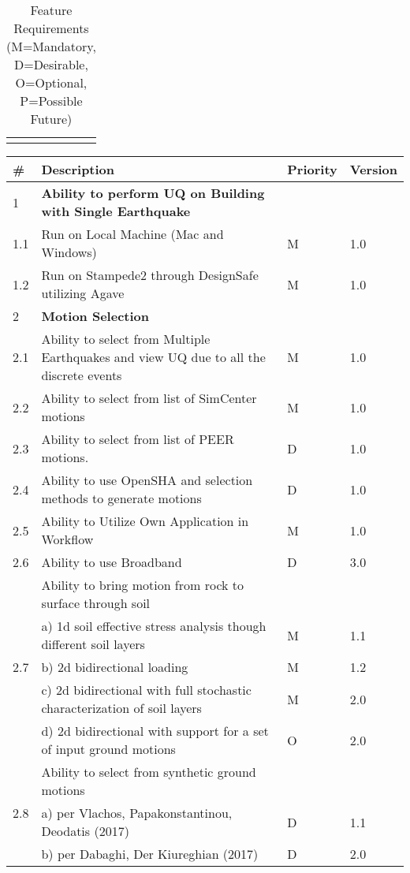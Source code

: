 {\begin{longtable}{| p{} | p{} | p{} | p{} |}
	\bottomrule 
\caption{Feature Requirements (M=Mandatory, D=Desirable, O=Optional, P=Possible Future)}             
  \label{tab:featureRequirements}                 
\end{longtable}
}{

\iffalse
\begin{longtable}{| p{} | p{} | p{} | p{} |}
    \toprule
      \# & Description & Priority & Version \\ \hline
      1 & \textbf{Ability to perform UQ on Building with Single Earthquake} &  &  \\ 
	1.1 & Run on Local Machine (Mac and Windows) & M & 1.0 \\ \hline
	1.2 & Run on Stampede2 through DesignSafe utilizing Agave & M & 1.0 \\ \hline
	2 & \textbf{Motion Selection} &  &  \\ \hline
	2.1 & Ability to select from Multiple Earthquakes and view UQ due to all the discrete events & M & 1.0  \\ \hline
	2.2 & Ability to select from list of SimCenter motions & M & 1.0 \\ \hline
	2.3 & Ability to select from list of PEER motions. & D & 1.0 \\ \hline
	2.4 & Ability to use OpenSHA and selection methods to generate motions & D & 1.0 \\ \hline
	2.5 & Ability to Utilize Own Application in Workflow & M & 1.0 \\ \hline
	2.6 & Ability to use Broadband & D & 3.0 \\ \hline
	\multirow{5}{*}{2.7} 
	& Ability to bring motion from rock to surface through soil &  &  \\ 
	 & a)     1d soil effective stress analysis though different soil layers & M & 1.1  \\ 
	 & b)     2d bidirectional loading & M & 1.2 \\ 
	 & c)     2d bidirectional with full stochastic characterization of soil layers & M & 2.0 \\
	 & d)     2d bidirectional with support for a set of input ground motions & O & 2.0 \\ 
	 \hline
	\multirow{5}{*}{2.8} 
	& Ability to select from synthetic ground motions &  &  \\
	 & a)     per Vlachos, Papakonstantinou, Deodatis (2017) & D & 1.1  \\ 
	 & b)     per Dabaghi, Der Kiureghian (2017) & D & 2.0 \\ \hline

\end{longtable}}
